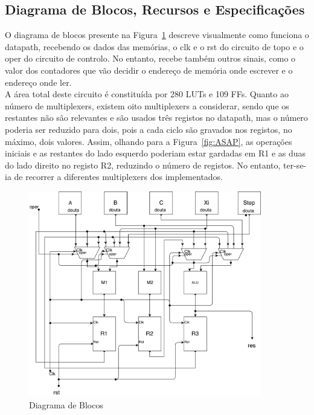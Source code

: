 \documentclass{article} %
\begin{document}
		\subsection{Diagrama de Blocos, Recursos e Especificações}
		O diagrama de blocos presente na Figura~\ref{fig:Diagrama} descreve visualmente como funciona o datapath, recebendo os dados das memórias, o clk e o rst do circuito de topo e o oper do circuito de controlo. No entanto, recebe também outros sinais, como o valor dos contadores que vão decidir o endereço de memória onde escrever e o endereço onde ler.\\

		\noindent A área total deste circuito é constituída por 280 LUTs e 109 FFs. Quanto ao número de multiplexers, existem oito multiplexers a considerar, sendo que os restantes não são relevantes e são usados três registos no datapath, mas o número poderia ser reduzido para dois, pois a cada ciclo são gravados nos registos, no máximo, dois valores. Assim, olhando para a Figura~\ref{fig:ASAP}, as operações iniciais e as restantes do lado esquerdo poderiam estar gardadas em R1 e as duas do lado direito no registo R2, reduzindo o número de registos. No entanto, ter-se-ia de recorrer a diferentes multiplexers dos implementados.\\

		\begin{figure}[htbp]
			\begin{center}
				\includegraphics[width=4in]{Block.pdf}
				\caption{Diagrama de Blocos}
				\label{fig:Diagrama}
			\end{center}
		\end{figure}
\end{document}
